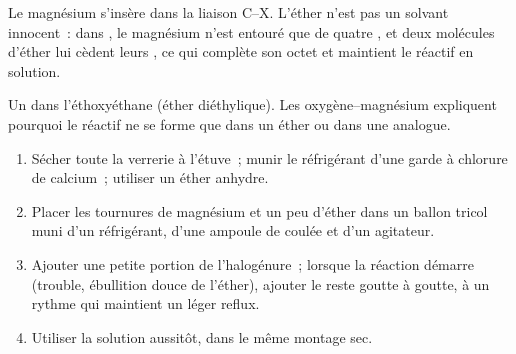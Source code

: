 Le magnésium s'insère dans la liaison C--X. L'éther n'est pas un solvant
innocent~: dans , le magnésium n'est entouré que de quatre
, et deux molécules d'éther lui cèdent leurs
, ce qui complète son octet et maintient le réactif en
solution.

\begin{omfigure}

{\small Un  dans l'éthoxyéthane (éther diéthylique).
Les  oxygène--magnésium expliquent pourquoi le réactif ne
se forme que dans un éther ou dans une  analogue.}
\end{omfigure}

\begin{method}\label{met:b1:organomagnesium:prepare}
\begin{enumerate}
  \item Sécher toute la verrerie à l'étuve~; munir le réfrigérant d'une
        garde à chlorure de calcium~; utiliser un éther anhydre.
  \item Placer les tournures de magnésium et un peu d'éther dans un
        ballon tricol muni d'un réfrigérant, d'une ampoule de coulée et
        d'un agitateur.
  \item Ajouter une petite portion de l'halogénure~; lorsque la réaction
        démarre (trouble, ébullition douce de l'éther), ajouter le reste
        goutte à goutte, à un rythme qui maintient un léger reflux.
  \item Utiliser la solution aussitôt, dans le même montage sec.
\end{enumerate}
\end{method}


